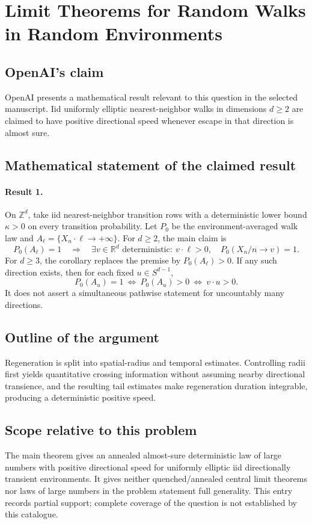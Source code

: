 \documentclass[11pt]{article}
\begin{document}
\section*{Limit Theorems for Random Walks in Random Environments}

\subsection{OpenAI's claim}
OpenAI presents a mathematical result relevant to this question in the selected manuscript. Iid uniformly elliptic nearest-neighbor walks in dimensions $d\geq2$ are claimed to have positive directional speed whenever escape in that direction is almost sure.

\subsection{Mathematical statement of the claimed result}
\paragraph{Result 1.} On \(\mathbb Z^d\), take iid nearest-neighbor transition rows with a deterministic lower bound \(\kappa>0\) on every transition probability. Let \(P_0\) be the environment-averaged walk law and \(A_\ell=\{X_n\cdot\ell\to+\infty\}\). For \(d\ge2\), the main claim is
\[
 P_0(A_\ell)=1\quad\Longrightarrow\quad
 \exists v\in\mathbb R^d\text{ deterministic}:\
 v\cdot\ell>0,\quad P_0(X_n/n\to v)=1.
\]
For \(d\ge3\), the corollary replaces the premise by \(P_0(A_\ell)>0\). If any such direction exists, then for each fixed \(u\in S^{d-1}\),
\[
 P_0(A_u)=1\ \Longleftrightarrow\ P_0(A_u)>0\ \Longleftrightarrow\ v\cdot u>0.
\]
It does not assert a simultaneous pathwise statement for uncountably many directions.

\subsection{Outline of the argument}
Regeneration is split into spatial-radius and temporal estimates. Controlling radii first yields quantitative crossing information without assuming nearby directional transience, and the resulting tail estimates make regeneration duration integrable, producing a deterministic positive speed.

\subsection{Scope relative to this problem}
The main theorem gives an annealed almost-sure deterministic law of large numbers with positive directional speed for uniformly elliptic iid directionally transient environments. It gives neither quenched/annealed central limit theorems nor laws of large numbers in the problem statement full generality. This entry records partial support; complete coverage of the question is not established by this catalogue.
\end{document}
